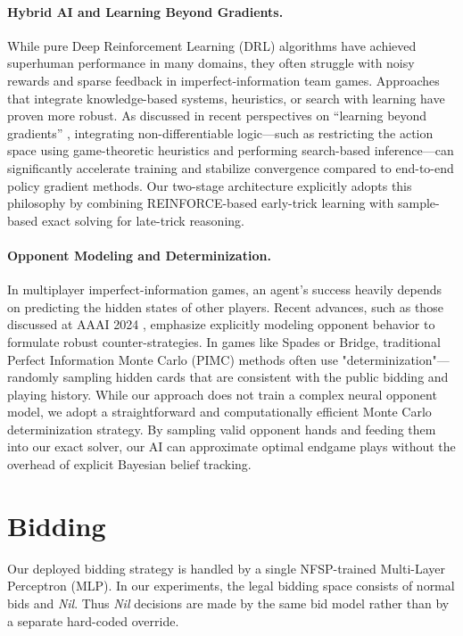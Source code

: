 \documentclass{article}
\begin{document}
\paragraph{Hybrid AI and Learning Beyond Gradients.} 
While pure Deep Reinforcement Learning (DRL) algorithms have achieved superhuman performance in many domains, they often struggle with noisy rewards and sparse feedback in imperfect-information team games. Approaches that integrate knowledge-based systems, heuristics, or search with learning have proven more robust. As discussed in recent perspectives on ``learning beyond gradients'' \citep{weng2026learning_beyond_gradients}, integrating non-differentiable logic---such as restricting the action space using game-theoretic heuristics and performing search-based inference---can significantly accelerate training and stabilize convergence compared to end-to-end policy gradient methods. Our two-stage architecture explicitly adopts this philosophy by combining REINFORCE-based early-trick learning with sample-based exact solving for late-trick reasoning.

\paragraph{Opponent Modeling and Determinization.} 
In multiplayer imperfect-information games, an agent's success heavily depends on predicting the hidden states of other players. Recent advances, such as those discussed at AAAI 2024 \citep{aaai2024opponent}, emphasize explicitly modeling opponent behavior to formulate robust counter-strategies. In games like Spades or Bridge, traditional Perfect Information Monte Carlo (PIMC) methods often use "determinization"---randomly sampling hidden cards that are consistent with the public bidding and playing history. While our approach does not train a complex neural opponent model, we adopt a straightforward and computationally efficient Monte Carlo determinization strategy. By sampling valid opponent hands and feeding them into our exact solver, our AI can approximate optimal endgame plays without the overhead of explicit Bayesian belief tracking.

\section{Bidding}
\label{sec:bidding}

Our deployed bidding strategy is handled by a single NFSP-trained Multi-Layer Perceptron (MLP). In our experiments, the legal bidding space consists of normal bids and \textit{Nil}. Thus \textit{Nil} decisions are made by the same bid model rather than by a separate hard-coded override.
\end{document}
